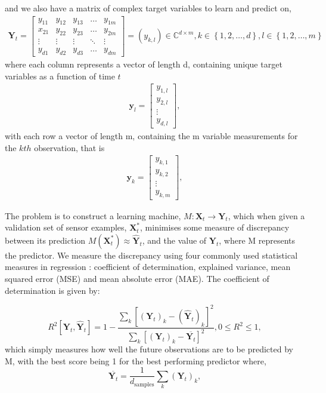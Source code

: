 and we also have a matrix of complex target variables to learn and predict on,
\begin{align*}
\textbf{Y}_{t}=\begin{bmatrix}
    y_{11} & y_{12} & y_{13} & \dots  & y_{1m} \\
    x_{21} & y_{22} & y_{23} & \dots  & y_{2m} \\
    \vdots & \vdots & \vdots & \ddots & \vdots \\
    y_{d1} & y_{d2} & y_{d3} & \dots  & y_{dm}
\end{bmatrix}=(y_{k,l}) \in  \mathbb{C}^{d \times m},  k\in \left\{1,2,\dots, d\right\}, l \in \left\{1,2,\dots,m\right\}
\end{align*}
where each column represents a vector of length d, containing unique target variables as a function of time $t$
\begin{align*}
\textbf{y}_{l}=\begin{bmatrix}
    y_{1,l}  \\
    y_{2,l} \\
    \vdots \\
    y_{d,l} 
\end{bmatrix},
\end{align*} 
with each row a vector of length m, containing the m variable measurements for the $kth$ observation, that is 
\begin{align*}
\textbf{y}_k=\begin{bmatrix}
    y_{k,1}  \\
    y_{k,2} \\
    \vdots \\
    y_{k,m} 
\end{bmatrix},
\end{align*}
 
The problem is to construct a learning machine, $M:\textbf{X}_{t} \rightarrow \textbf{Y}_{t}$, which when given a validation set of sensor examples, $\textbf{X}^*_{t}$, minimises some measure of discrepancy between its prediction $M(\textbf{X}^*_{t})\approx\widehat{\textbf{Y}}_{t}$, and the value of $\textbf{Y}_{t}$, where M represents the predictor. We measure the discrepancy using four commonly used statistical measures in regression \citep{borchani2015survey}: coefficient of determination, explained variance, mean squared error (MSE) and mean absolute error (MAE). The coefficient of determination is given by:

\begin{equation}
R^2\left[\textbf{Y}_{t},\widehat{\textbf{Y}}_{t}\right]=1-\frac{\sum_{k} \left[(\textbf{Y}_{t})_{k}-(\widehat{\textbf{Y}}_{t})_{k}\right]^2}{\sum_{k}\left[(\textbf{Y}_{t})_{k}-\overline{\textbf{Y}_{t}}\right]^2}, 0 \leq R^2 \leq 1,
\label{R2score}
\end{equation}
which simply measures how well the future observations are to be predicted by M, with the best score being 1 for the best performing predictor 
where,  \begin{equation}
\overline{\textbf{Y}_{t}}=\frac{1}{d_{\mathrm{samples}}} \sum_{k} (\textbf{Y}_{t})_{k},
\end{equation} 

